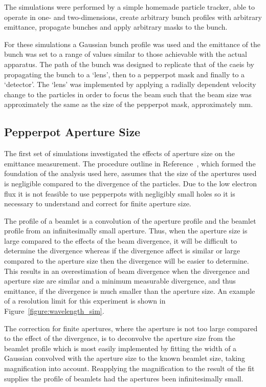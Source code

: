 The simulations were performed by a simple homemade particle tracker, able to operate in one- and two-dimensions, create arbitrary bunch profiles with arbitrary emittance, propagate bunches and apply arbitrary masks to the bunch.

For these simulations a Gaussian bunch profile was used and the emittance of the bunch was set to a range of values similar to those achievable with the actual apparatus.
The path of the bunch was designed to replicate that of the \gls{caeis} by propagating the bunch to a `lens', then to a pepperpot mask and finally to a `detector'.
The `lens' was implemented by applying a radially dependent velocity change to the particles in order to focus the beam such that the beam size was approximately the same as the size of the pepperpot mask, approximately \unit[2]{mm}.

\subsection{Pepperpot Aperture Size}

The first set of simulations investigated the effects of aperture size on the emittance measurement.
The procedure outline in Reference~\cite{zhang_emittance_1996}, which formed the foundation of the analysis used here, assumes that the size of the apertures used is negligible compared to the divergence of the particles.
Due to the low electron flux it is not feasible to use pepperpots with negligibly small holes so it is necessary to understand and correct for finite aperture size.

The profile of a beamlet is a convolution of the aperture profile and the beamlet profile from an infinitesimally small aperture.
Thus, when the aperture size is large compared to the effects of the beam divergence, it will be difficult to determine the divergence whereas if the divergence affect is similar or large compared to the aperture size then the divergence will be easier to determine.
This results in an overestimation of beam divergence when the divergence and aperture size are similar and a minimum measurable divergence, and thus emittance, if the divergence is much smaller than the aperture size.
An example of a resolution limit for this experiment is shown in Figure~\ref{figure:wavelength_sim}.

The correction for finite apertures, where the aperture is not too large compared to the effect of the divergence, is to deconvolve the aperture size from the beamlet profile which is most easily implemented by fitting the width of a Gaussian convolved with the aperture size to the known beamlet size, taking magnification into account.
Reapplying the magnification to the result of the fit supplies the profile of beamlets had the apertures been infinitesimally small.

